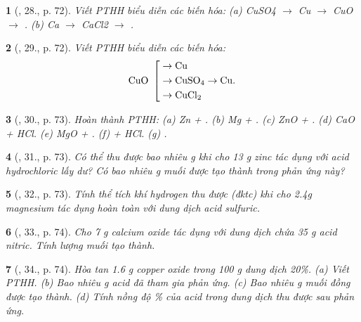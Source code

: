 \documentclass{article}
\newtheorem{baitoan}{}
\begin{document}
\begin{baitoan}[\cite{An_Hoa_Hoc_nang_cao_8_9}, 28., p. 72]
	Viết PTHH biểu diễn các biến hóa: (a) {\rm{\ce CuSO4} $\to$ Cu $\to$ CuO $\to$ }. (b) {\rm Ca $\to$ CaCl2 $\to$ }.
\end{baitoan}

\begin{baitoan}[\cite{An_Hoa_Hoc_nang_cao_8_9}, 29., p. 72]
	Viết PTHH biểu diễn các biến hóa: 
	\begin{equation*}
		{\rm CuO}\ \left[\begin{split}
			&\to{\rm Cu}\\
			&\to\ce{CuSO4}\to{\rm Cu}.\\
			&\to\ce{CuCl2}
		\end{split}\right.
	\end{equation*}
\end{baitoan}

\begin{baitoan}[\cite{An_Hoa_Hoc_nang_cao_8_9}, 30., p. 73]
	Hoàn thành PTHH: (a) {\rm Zn + }. (b) {\rm Mg + }. (c) {\rm ZnO + }. (d) {\rm CaO + HCl}. (e) {\rm MgO + }. (f) {\rm{} + HCl}. (g) {\rm{}}.
\end{baitoan}

\begin{baitoan}[\cite{An_Hoa_Hoc_nang_cao_8_9}, 31., p. 73]
	Có thể thu được bao nhiêu {\rm g } khi cho {\rm13 g} zinc tác dụng với acid hydrochloric lấy dư? Có bao nhiêu {\rm g} muối được tạo thành trong phản ứng này?
\end{baitoan}

\begin{baitoan}[\cite{An_Hoa_Hoc_nang_cao_8_9}, 32., p. 73]
	Tính thể tích khí hydrogen thu được (đktc) khi cho {\rm2.4g} magnesium tác dụng hoàn toàn với dung dịch acid sulfuric.
\end{baitoan}

\begin{baitoan}[\cite{An_Hoa_Hoc_nang_cao_8_9}, 33., p. 74]
	Cho {\rm7 g} calcium oxide tác dụng với dung dịch chứa {\rm35 g} acid nitric. Tính lượng muối tạo thành.
\end{baitoan}

\begin{baitoan}[\cite{An_Hoa_Hoc_nang_cao_8_9}, 34., p. 74]
	Hòa tan {\rm1.6 g} copper oxide trong {\rm100 g} dung dịch {\rm{} 20\%}. (a) Viết PTHH. (b) Bao nhiêu {\rm g} acid đã tham gia phản ứng. (c) Bao nhiêu {\rm g} muối đồng được tạo thành. (d) Tính nồng độ {\rm\%} của acid trong dung dịch thu được sau phản ứng.
\end{baitoan}
\end{document}
